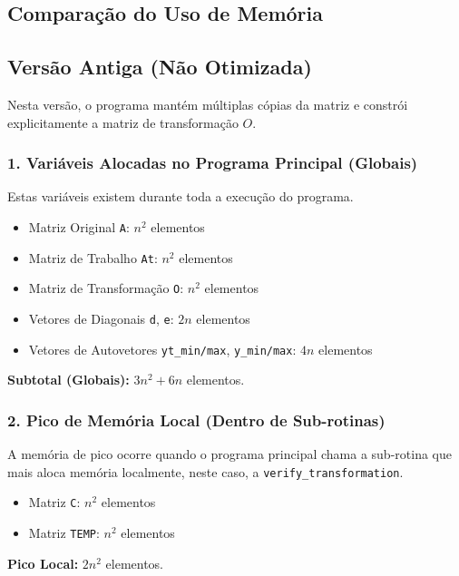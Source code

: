 \documentclass[12pt, a4paper]{article} %
\begin{document}
        \subsection*{Compara\c{c}\~ao do Uso de Mem\'oria}

            \subsection*{Vers\~ao Antiga (N\~ao Otimizada)}

            Nesta vers\~ao, o programa mant\'em m\'ultiplas c\'opias da matriz e constr\'oi explicitamente a matriz de transforma\c{c}\~ao $O$.

            \subsubsection*{1. Vari\'aveis Alocadas no Programa Principal (Globais)}
            Estas vari\'aveis existem durante toda a execu\c{c}\~ao do programa.
            \begin{itemize}
                \item Matriz Original \texttt{A}: $n^2$ elementos
                \item Matriz de Trabalho \texttt{At}: $n^2$ elementos
                \item Matriz de Transforma\c{c}\~ao \texttt{O}: $n^2$ elementos
                \item Vetores de Diagonais \texttt{d}, \texttt{e}: $2n$ elementos
                \item Vetores de Autovetores \texttt{yt\_min/max}, \texttt{y\_min/max}: $4n$ elementos
            \end{itemize}
            \textbf{Subtotal (Globais):} $3n^2 + 6n$ elementos.

            \subsubsection*{2. Pico de Mem\'oria Local (Dentro de Sub-rotinas)}
            A mem\'oria de pico ocorre quando o programa principal chama a sub-rotina que mais aloca mem\'oria localmente, neste caso, a \texttt{verify\_transformation}.
            \begin{itemize}
                \item Matriz \texttt{C}: $n^2$ elementos
                \item Matriz \texttt{TEMP}: $n^2$ elementos
            \end{itemize}
            \textbf{Pico Local:} $2n^2$ elementos.
\end{document}
